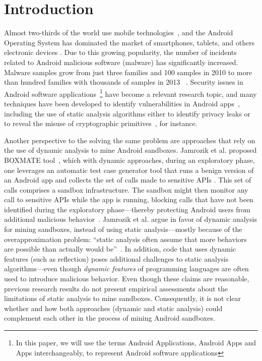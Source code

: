 \section{Introduction}\label{sec:introduction}

Almost two-thirds of the world use mobile technologies~\cite{Comscore}, and the Android Operating System has dominated the market of smartphones, tablets, and others electronic devices \cite{statcounter}. Due to this growing popularity, the number of incidents related to Android malicious software (malware) has significantly increased. Malware samples grow from just three families and 100 samples in 2010 to more than hundred families with thousands of samples in 2013~\cite{DBLP:journals/comsur/FarukiBLGGCR15,DBLP:journals/csur/SufatrioTCT15}%
. Security issues in Android software applications~\footnote{In this paper, we will use the terms Android Applications, Android Apps and Apps interchangeably, to represent Android software applications} have become a relevant research topic, and many techniques have been developed to identify vulnerabilities in Android apps~\cite{DBLP:conf/pldi/ArztRFBBKTOM14}, including the use of static analysis algorithms either to identify privacy leaks or to reveal the misuse of cryptographic primitives~\cite{krueger:ecoop-2018,rahaman:ccs-2019}, for instance.

Another perspective to the solving the same problem are approaches that rely on the use of dynamic analysis to mine Android sandboxes. Jamrozik et al. proposed BOXMATE tool~\cite{DBLP:conf/icse/JamrozikSZ16}, which with dynamic approaches, during an exploratory phase, one leverages an automatic test case generator tool that runs a benign version of an Android app and collects the set of calls made to sensitive APIs
. This set of calls comprises a sandbox infrastructure. The sandbox might then monitor any call to sensitive APIs while the app is running, blocking calls that have not been identified during the exploratory phase---thereby protecting Android users from additional malicious behavior~\cite{DBLP:conf/icse/JamrozikSZ16}.
Jamrozik et al. argue in favor of dynamic analysis for mining sandboxes, instead of using static analysis---mostly because of the overapproximation problem: ``static analysis often assume that more behaviors are possible than actually would be''~\cite{DBLP:conf/icse/JamrozikSZ16}. In addition, code that uses dynamic features (such as reflection) poses additional challenges to static analysis algorithms---even though \emph{dynamic features} of programming languages are often used to introduce malicious behavior. Even though these claims are reasonable, previous research results do not present empirical assessments about the limitations of static analysis to mine sandboxes. Consequently, it is not clear whether and how both approaches (dynamic and static analysis) could complement each other in the process of mining Android sandboxes.

